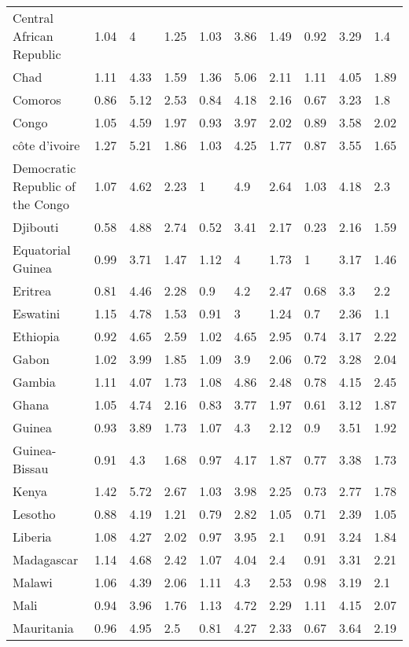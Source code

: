 \begin{longtable}[t]{llllllllll}
Central African Republic & 1.04 & 4 & 1.25 & 1.03 & 3.86 & 1.49 & 0.92 & 3.29 & 1.4\\
Chad & 1.11 & 4.33 & 1.59 & 1.36 & 5.06 & 2.11 & 1.11 & 4.05 & 1.89\\
Comoros & 0.86 & 5.12 & 2.53 & 0.84 & 4.18 & 2.16 & 0.67 & 3.23 & 1.8\\
Congo & 1.05 & 4.59 & 1.97 & 0.93 & 3.97 & 2.02 & 0.89 & 3.58 & 2.02\\
côte d'ivoire & 1.27 & 5.21 & 1.86 & 1.03 & 4.25 & 1.77 & 0.87 & 3.55 & 1.65\\
Democratic Republic of the Congo & 1.07 & 4.62 & 2.23 & 1 & 4.9 & 2.64 & 1.03 & 4.18 & 2.3\\
Djibouti & 0.58 & 4.88 & 2.74 & 0.52 & 3.41 & 2.17 & 0.23 & 2.16 & 1.59\\
Equatorial Guinea & 0.99 & 3.71 & 1.47 & 1.12 & 4 & 1.73 & 1 & 3.17 & 1.46\\
Eritrea & 0.81 & 4.46 & 2.28 & 0.9 & 4.2 & 2.47 & 0.68 & 3.3 & 2.2\\
Eswatini & 1.15 & 4.78 & 1.53 & 0.91 & 3 & 1.24 & 0.7 & 2.36 & 1.1\\
Ethiopia & 0.92 & 4.65 & 2.59 & 1.02 & 4.65 & 2.95 & 0.74 & 3.17 & 2.22\\
Gabon & 1.02 & 3.99 & 1.85 & 1.09 & 3.9 & 2.06 & 0.72 & 3.28 & 2.04\\
Gambia & 1.11 & 4.07 & 1.73 & 1.08 & 4.86 & 2.48 & 0.78 & 4.15 & 2.45\\
Ghana & 1.05 & 4.74 & 2.16 & 0.83 & 3.77 & 1.97 & 0.61 & 3.12 & 1.87\\
Guinea & 0.93 & 3.89 & 1.73 & 1.07 & 4.3 & 2.12 & 0.9 & 3.51 & 1.92\\
Guinea-Bissau & 0.91 & 4.3 & 1.68 & 0.97 & 4.17 & 1.87 & 0.77 & 3.38 & 1.73\\
Kenya & 1.42 & 5.72 & 2.67 & 1.03 & 3.98 & 2.25 & 0.73 & 2.77 & 1.78\\
Lesotho & 0.88 & 4.19 & 1.21 & 0.79 & 2.82 & 1.05 & 0.71 & 2.39 & 1.05\\
Liberia & 1.08 & 4.27 & 2.02 & 0.97 & 3.95 & 2.1 & 0.91 & 3.24 & 1.84\\
Madagascar & 1.14 & 4.68 & 2.42 & 1.07 & 4.04 & 2.4 & 0.91 & 3.31 & 2.21\\
Malawi & 1.06 & 4.39 & 2.06 & 1.11 & 4.3 & 2.53 & 0.98 & 3.19 & 2.1\\
Mali & 0.94 & 3.96 & 1.76 & 1.13 & 4.72 & 2.29 & 1.11 & 4.15 & 2.07\\
Mauritania & 0.96 & 4.95 & 2.5 & 0.81 & 4.27 & 2.33 & 0.67 & 3.64 & 2.19\\

\end{longtable}
